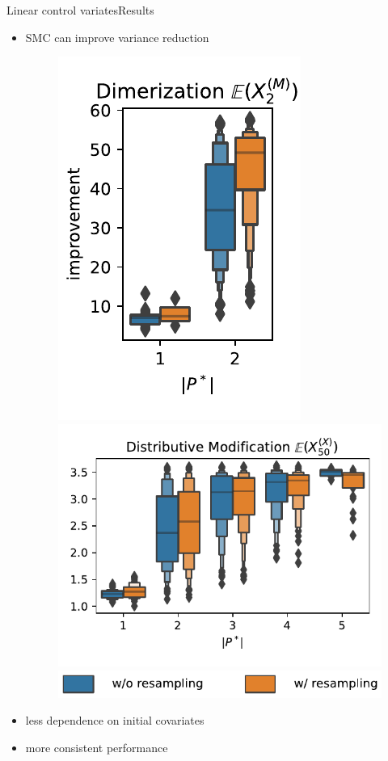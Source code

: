 \documentclass[9pt]{beamer}
\begin{document}
\begin{frame}{Linear control variates}{Results}
    \begin{itemize}
        \item SMC can improve variance reduction
    \begin{figure}
        \includegraphics[scale=.4]{../gfx/dim_improvement_numcv.pdf}
        \includegraphics[scale=.4]{../gfx/dm_improvement_numcv.pdf}\\
        \includegraphics[scale=.4]{../gfx/improvement_numcv_legend.pdf}
    \end{figure}
    \item less dependence on initial covariates
    \item more consistent performance
    \end{itemize}
\end{frame}
\end{document}
